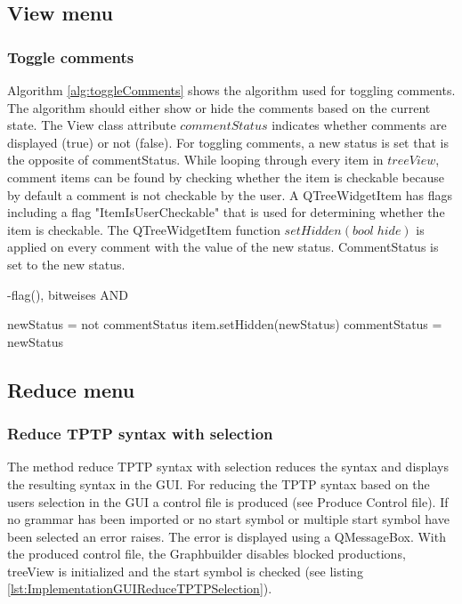 \subsection{View menu}\label{sec:ImplementationGUIViewMenu}
\subsubsection{Toggle comments}\label{sec:ImplementationGUIToggleComments}

Algorithm \ref{alg:toggleComments} shows the algorithm used for toggling comments. The algorithm should either show or hide the comments based on the current state. 
The View class attribute $commentStatus$ indicates whether comments are displayed (true) or not (false). For toggling comments, a new status is set that is the opposite of commentStatus. While looping through every item in $treeView$, comment items can be found by checking whether the item is checkable because by default a comment is not checkable by the user. A QTreeWidgetItem has flags including a flag "ItemIsUserCheckable" that is used for determining whether the item is checkable. The QTreeWidgetItem function $setHidden(bool\;hide)$ is applied on every comment with the value of the new status. CommentStatus is set to the new status. 

-flag(), bitweises AND 

\begin{algorithm}[H]
\caption{GUI Algorithm: toggle\textunderscore comments}
\label{alg:toggleComments}
\begin{algorithmic}[1] 
\State newStatus = not commentStatus
		\State item.setHidden(newStatus)
	\EndIf
\EndFor
\State commentStatus = newStatus
\end{algorithmic}
\end{algorithm}

\subsection{Reduce menu}\label{sec:ImplementationGUIReduceMenu}
\subsubsection{Reduce \ac{TPTP} syntax with selection}\label{sec:ImplementationGUIReduceWithSelection}

The method reduce \ac{TPTP} syntax with selection reduces the syntax and displays the resulting syntax in the GUI. 
For reducing the \ac{TPTP} syntax based on the users selection in the GUI a control file is produced (see Produce Control file). If no grammar has been imported or no start symbol or multiple start symbol have been selected an error raises. The error is displayed using a QMessageBox. With the produced control file, the Graphbuilder disables blocked productions, treeView is initialized  and the start symbol is checked (see listing \ref{lst:ImplementationGUIReduceTPTPSelection}). 

